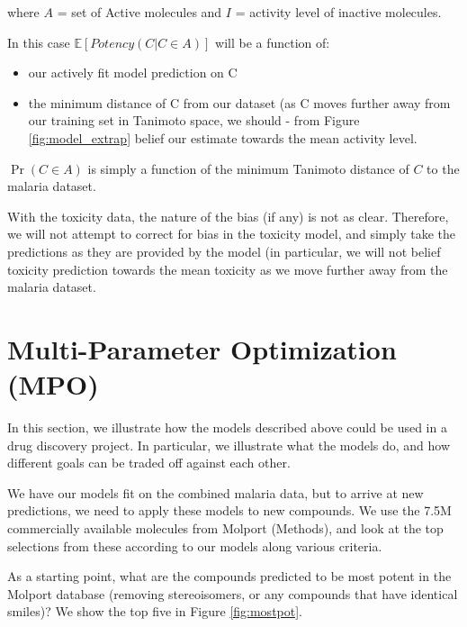 \documentclass{article}
\begin{document}
where $A$ = set of Active molecules and $I$ = activity level of inactive molecules.

In this case $\mathbb{E}[Potency(C | C \in A)]$ will be a function of: \begin{itemize}
    \item our actively fit model prediction on C
    \item the minimum distance of C from our dataset (as C moves further away from our training set in Tanimoto space, we should - from Figure \ref{fig:model_extrap} belief our estimate towards the mean activity level.
\end{itemize}

$\Pr(C \in A)$ is simply a function of the minimum Tanimoto distance of $C$ to the malaria dataset.


With the toxicity data, the nature of the bias (if any) is not as clear.  Therefore, we will not attempt to correct for bias in the toxicity model, and simply take the predictions as they are provided by the model (in particular, we will not belief toxicity prediction towards the mean toxicity as we move further away from the malaria dataset.


\section{Multi-Parameter Optimization (MPO)}

In this section, we illustrate how the models described above could be used in a drug discovery project. In particular, we illustrate what the models do, and how different goals can be traded off against each other.

We have our models fit on the combined malaria data, but to arrive at new predictions, we need to apply these models to new compounds.  We use the 7.5M commercially available molecules from Molport (Methods), and look at the top selections from these according to our models along various criteria.

As a starting point, what are the compounds predicted to be most potent in the Molport database (removing stereoisomers, or any compounds that have identical 
smiles)?  We show the top five in Figure \ref{fig:mostpot}.
\end{document}
